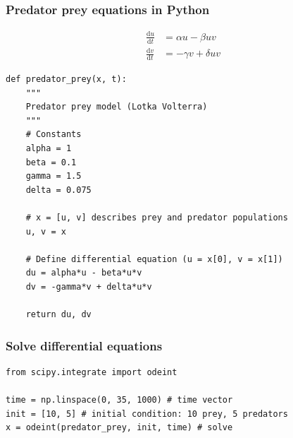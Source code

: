 \documentclass[xcolor=table]{beamer}
\begin{document}
\begin{frame}[fragile]
\frametitle{Predator prey equations in Python}

\vspace{-0.4cm}
\scriptsize
\begin{align*}
    \frac{\mathrm{d}u}{\mathrm{d}t} &= \alpha u - \beta uv\\[0.5em]
\frac{\mathrm{d}v}{\mathrm{d}t} &= -\gamma v + \delta uv 
\end{align*}
\normalsize


\begin{lstlisting}[style=python]
def predator_prey(x, t):
    """
	Predator prey model (Lotka Volterra)
    """
    # Constants
    alpha = 1
    beta = 0.1
    gamma = 1.5
    delta = 0.075
    
    # x = [u, v] describes prey and predator populations
    u, v = x
    
    # Define differential equation (u = x[0], v = x[1])
    du = alpha*u - beta*u*v
    dv = -gamma*v + delta*u*v
    
    return du, dv
\end{lstlisting}

\end{frame}

\begin{frame}[fragile]
\frametitle{Solve differential equations}

\begin{lstlisting}[style=python] 
from scipy.integrate import odeint

time = np.linspace(0, 35, 1000) # time vector
init = [10, 5] # initial condition: 10 prey, 5 predators
x = odeint(predator_prey, init, time) # solve
\end{lstlisting}

\vspace{-.8cm}


\end{frame}
\end{document}
